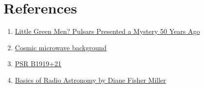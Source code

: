 \documentclass{../template/texnote}
\begin{document}
\section{References}
\begin{enumerate}
    \item \href{https://www.space.com/38916-pulsar-discovery-little-green-men.html}{Little Green Men? Pulsars Presented a Mystery 50 Years Ago}
    \item \href{https://en.wikipedia.org/wiki/Cosmic_microwave_background}{Cosmic microwave background}
    \item \href{https://en.wikipedia.org/wiki/PSR_B1919%2B21}{PSR B1919+21}
	\item \href{https://www2.jpl.nasa.gov/radioastronomy/radioastronomy_all.pdf}{Basics of Radio Astronomy by Diane Fisher Miller}
\end{enumerate}
    \printbibliography
\end{document}
